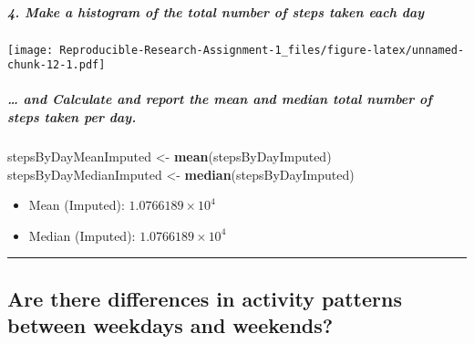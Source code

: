 \documentclass[]{article}
\newenvironment{Shaded}{\begin{snugshade}}{\end{snugshade}}
\newcommand{\DataTypeTok}[1]{\textcolor[rgb]{0.13,0.29,0.53}{#1}}
\newcommand{\DecValTok}[1]{\textcolor[rgb]{0.00,0.00,0.81}{#1}}
\newcommand{\KeywordTok}[1]{\textcolor[rgb]{0.13,0.29,0.53}{\textbf{#1}}}
\newcommand{\NormalTok}[1]{#1}
\newcommand{\OperatorTok}[1]{\textcolor[rgb]{0.81,0.36,0.00}{\textbf{#1}}}
\newcommand{\StringTok}[1]{\textcolor[rgb]{0.31,0.60,0.02}{#1}}
\providecommand{\tightlist}{%
  \setlength{\itemsep}{0pt}\setlength{\parskip}{0pt}}
\let\oldsubparagraph\subparagraph
\renewcommand{\subparagraph}[1]{\oldsubparagraph{#1}\mbox{}}
\begin{document}
\hypertarget{make-a-histogram-of-the-total-number-of-steps-taken-each-day-1}{%
\subparagraph{4. Make a histogram of the total number of steps taken
each
day}\label{make-a-histogram-of-the-total-number-of-steps-taken-each-day-1}}

\begin{Shaded}
\end{Shaded}

\texttt{[image: Reproducible-Research-Assignment-1\_files/figure-latex/unnamed-chunk-12-1.pdf]}

\hypertarget{and-calculate-and-report-the-mean-and-median-total-number-of-steps-taken-per-day.}{%
\subparagraph{\ldots{} and Calculate and report the mean and median
total number of steps taken per
day.}\label{and-calculate-and-report-the-mean-and-median-total-number-of-steps-taken-per-day.}}

\begin{Shaded}
\begin{Highlighting}[]
\NormalTok{stepsByDayMeanImputed <-}\StringTok{ }\KeywordTok{mean}\NormalTok{(stepsByDayImputed)}
\NormalTok{stepsByDayMedianImputed <-}\StringTok{ }\KeywordTok{median}\NormalTok{(stepsByDayImputed)}
\end{Highlighting}
\end{Shaded}

\begin{itemize}
\tightlist
\item
  Mean (Imputed): \ensuremath{1.0766189\times 10^{4}}
\item
  Median (Imputed): \ensuremath{1.0766189\times 10^{4}}
\end{itemize}

\begin{center}\rule{0.5\linewidth}{\linethickness}\end{center}

\hypertarget{are-there-differences-in-activity-patterns-between-weekdays-and-weekends}{%
\subsection{Are there differences in activity patterns between weekdays
and
weekends?}\label{are-there-differences-in-activity-patterns-between-weekdays-and-weekends}}
\end{document}
